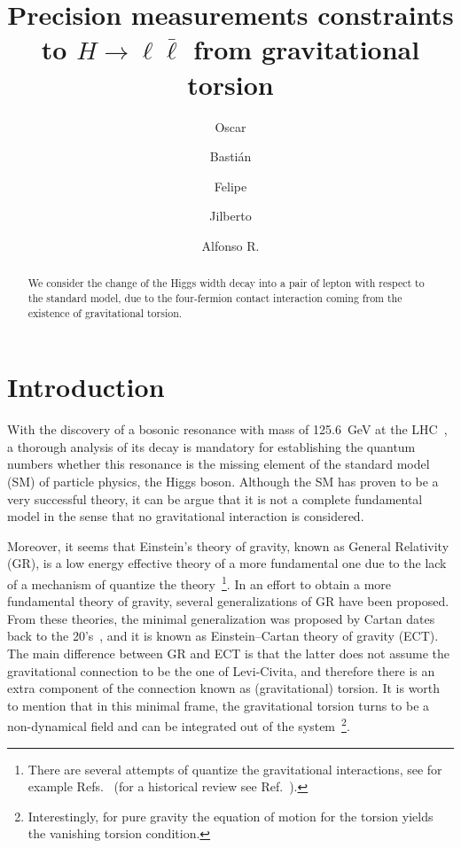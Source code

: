 \documentclass[twocolumn,aps,prd,showkeys,showpacs,groupedaddress,byrevtex]{revtex4-1}
\begin{document}
\title{Precision measurements constraints to $H \to \ell \bar{\ell}$ from gravitational torsion}

\author{Oscar }
\author{Basti\'an }
\author{Felipe }
\author{Jilberto }
\author{Alfonso R. }



\affiliation{\UTFSM}
\affiliation{\CCTVal}

\begin{abstract}
  We consider the change of the Higgs width decay into a pair of lepton with respect to the standard model, due to the four-fermion contact interaction coming from the existence of gravitational torsion.
\end{abstract}



\maketitle

\section{\label{intro}Introduction}

With the discovery of a bosonic resonance with mass of  \SI{125.6}{\GeV} at the LHC~\cite{Aaltonen:2012qt,Aad:2012tfa,Chatrchyan:2012ufa}, a thorough  analysis of its decay is mandatory for establishing the quantum numbers whether this resonance is the missing element of the standard model (SM) of particle physics, the Higgs boson. Although the SM has proven to be a very successful theory, it can be argue that it is not a complete fundamental model in the sense that no gravitational interaction is considered.

Moreover, it seems that Einstein's theory of gravity, known as General Relativity (GR), is a low energy effective theory of a more fundamental one due to the lack of a mechanism of quantize the theory~\footnote{There are several attempts of quantize the gravitational interactions, see for example Refs.~\cite{Ashtekar:1986yd,*Ashtekar:1987gu,*Ashtekar:2004eh,DeWitt:1967yk,*DeWitt:1967ub,*DeWitt:1967uc} (for a historical review see Ref.~\cite{Rovelli:2000aw}).}. In an effort to obtain a more fundamental theory of gravity, several generalizations of GR have been proposed. From these theories, the minimal generalization was proposed by Cartan dates back to the 20's~\cite{Cartan-Einstein,Cartan1922,*Cartan1923,*Cartan1924,*Cartan1925}, and it is known as Einstein--Cartan theory of gravity (ECT). The main difference between GR and ECT is that the latter does not assume the gravitational connection to be the one of Levi-Civita, and therefore there is an extra component of the connection known as (gravitational) torsion. It is worth to mention that in this minimal frame, the gravitational torsion turns to be a non-dynamical field and can be integrated out of the system~\footnote{Interestingly, for pure gravity the equation of motion for the torsion yields the vanishing torsion condition.}.
\end{document}
